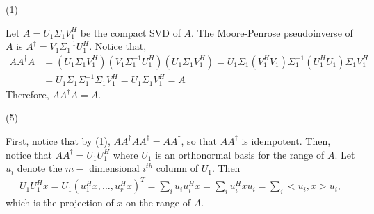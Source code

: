 \documentclass[11.5pt, letterpaper, bibtotoc,
    tablecaptionabove, figurecaptionabove]{article}
\begin{document}
(1)

Let $A = U_1 \Sigma_1 V_1^H$ be the compact SVD of $A$. 
The Moore-Penrose pseudoinverse of $A$ is $A^{\dagger} = V_1 \Sigma^{-1}_1 U^H_1$.
Notice that,
\begin{align*}
    A A^{\dagger} A  &= (U_1 \Sigma_1 V_1^H)(V_1 \Sigma^{-1}_1 U^H_1) (U_1 \Sigma_1 V_1^H)
	=  U_1 \Sigma_1 (V_1^HV_1) \Sigma^{-1}_1 (U^H_1 U_1) \Sigma_1 V_1^H \\
	&= U_1 \Sigma_1  \Sigma^{-1}_1 \Sigma_1 V_1^H
	= U_1 \Sigma_1 V_1^H = A
\end{align*}
Therefore, $ A A^{\dagger} A = A$.

(5)

First, notice that by (1), $AA^\dagger AA^\dagger = AA^\dagger$, so that $AA^\dagger$ is idempotent.
Then, notice that $AA^\dagger=U_1U_1^H$ where $U_1$ is an orthonormal basis for the range of $A$.
Let $u_i$ denote the $m-$ dimensional $i^{th}$ column of $U_1$. 
Then
\begin{align*}
    U_1U_1^Hx=U_1(u_1^Hx, \ldots, u_r^Hx)^T
    = \sum_iu_iu_i^Hx = \sum_iu_i^Hxu_i  = \sum_i<u_i,x>u_i,
\end{align*}
which is the projection of $x$ on the range of $A$.
\end{document}
